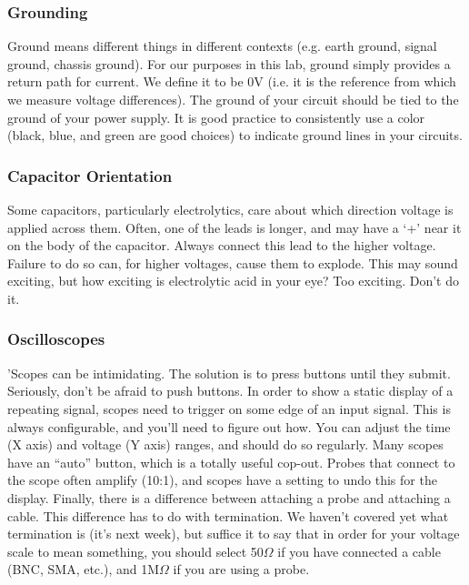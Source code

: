 \documentclass[11pt,preprint]{aastex}
\begin{document}
\subsubsection{Grounding}

Ground means different things in different contexts (e.g. earth ground, signal
ground, chassis ground).  For our purposes in this lab, ground simply provides
a return path for current.  We define it to be 0V (i.e. it is the reference
from which we measure voltage differences).  The ground of your circuit should
be tied to the ground of your power supply.  It is good practice to
consistently use a color (black, blue, and green are good choices) to indicate
ground lines in your circuits.

\subsubsection{Capacitor Orientation}

Some capacitors, particularly electrolytics, care about which direction voltage
is applied across them.  Often, one of the leads is longer, and may have a
`+' near it on the body of the capacitor.  Always connect this lead to the
higher voltage.  Failure to do so can, for higher voltages, cause them to
explode.  This may sound exciting, but how exciting is electrolytic acid in
your eye?  Too exciting.  Don't do it.

\subsubsection{Oscilloscopes}

'Scopes can be intimidating.  The solution is to press buttons until they
submit.  Seriously, don't be afraid to push buttons.  In order to show a static
display of a repeating signal, scopes need to trigger on some edge of an input
signal.  This is always configurable, and you'll need to figure out how.  You
can adjust the time (X axis) and voltage (Y axis) ranges, and should do so
regularly.  Many scopes have an ``auto'' button, which is a totally useful
cop-out.  Probes that connect to the scope often amplify (10:1), and scopes
have a setting to undo this for the display.  Finally, there is a difference
between attaching a probe and attaching a cable.  This difference has to do
with termination.  We haven't covered yet what termination is (it's next week),
but suffice it to say that in order for your voltage scale to mean something,
you should select 50$\Omega$ if you have connected a cable (BNC, SMA, etc.),
and 1M$\Omega$ if you are using a probe.
\end{document}
